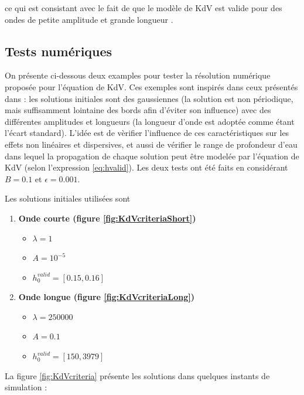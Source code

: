 \noindent ce qui est consistant avec le fait de que le modèle de KdV est valide pour des ondes de petite amplitude et grande longueur \cite{BBM1971}.

\subsection{Tests numériques}

\indent On présente ci-dessous deux examples pour tester la résolution numérique proposée pour l'équation de KdV. Ces exemples sont inspirés dans ceux présentés dans \cite{conservationLaws2002}: les solutions initiales sont des gaussiennes (la solution est non périodique, mais suffisamment lointaine des bords afin d'éviter son influence) avec des différentes amplitudes et longueurs (la longueur d'onde est adoptée comme étant l'écart standard). L'idée est de vèrifier l'influence de ces caractéristiques sur les effets non linéaires et dispersives, et aussi de vérifier le range de profondeur d'eau dans lequel la propagation de chaque solution peut être modelée par l'équation de KdV (selon l'expression \ref{eq:hvalid}). Les deux tests ont été faits en considérant $B = 0.1$ et $\epsilon = 0.001$.

\indent Les solutions initiales utilisées sont

\begin{enumerate}
	\item \textbf{Onde courte (figure \ref{fig:KdVcriteriaShort})} %
		\begin{itemize}
			\item $\lambda = 1$
			\item $ A = 10^{-5}$
			\item $ h_0^{valid} = [0.15, 0.16] $
		\end{itemize}
	\item \textbf{Onde longue (figure \ref{fig:KdVcriteriaLong})} %
		\begin{itemize}
			\item $\lambda = 250000$
			\item $ A = 0.1$
			\item $ h_0^{valid} = [150, 3979] $
		\end{itemize}
\end{enumerate}

\indent La figure \ref{fig:KdVcriteria} présente les solutions dans quelques instants de simulation :

